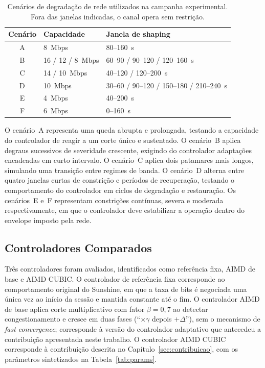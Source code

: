 \begin{table}[!t]
  \caption{Cenários de degradação de rede utilizados na campanha
  experimental. Fora das janelas indicadas, o canal opera sem
  restrição.}
  \label{tab:scenarios}
  \centering
  \begin{tabular}{cll}
    \toprule
    \textbf{Cenário} & \textbf{Capacidade} & \textbf{Janela de shaping} \\
    \midrule
    A & 8~Mbps & 80--160~s \\
    B & 16 / 12 / 8~Mbps & 60--90 / 90--120 / 120--160~s \\
    C & 14 / 10~Mbps & 40--120 / 120--200~s \\
    D & 10~Mbps & 30--60 / 90--120 / 150--180 / 210--240~s \\
    E & 4~Mbps & 40--200~s \\
    F & 6~Mbps & 0--160~s \\
    \bottomrule
  \end{tabular}
\end{table}

O cenário~A representa uma queda abrupta e prolongada,
testando a capacidade do controlador de reagir a um corte
único e sustentado. O cenário~B aplica degraus sucessivos de
severidade crescente, exigindo do controlador adaptações
encadeadas em curto intervalo. O cenário~C aplica dois
patamares mais longos, simulando uma transição entre regimes
de banda. O cenário~D alterna entre quatro janelas curtas de
constrição e períodos de recuperação, testando o
comportamento do controlador em ciclos de degradação e
restauração. Os cenários~E e~F representam constrições
contínuas, severa e moderada respectivamente, em que o
controlador deve estabilizar a operação dentro do envelope
imposto pela rede.

\subsection{Controladores Comparados}

Três controladores foram avaliados, identificados como
referência fixa, AIMD de base e AIMD CUBIC. O controlador de
referência fixa corresponde ao comportamento original do
Sunshine, em que a taxa de bits é negociada uma única vez ao
início da sessão e mantida constante até o fim. O controlador
AIMD de base aplica corte multiplicativo com fator $\beta = 0{,}7$
ao detectar congestionamento e cresce em duas fases
(``$\times \gamma$ depois $+\Delta$''), sem o mecanismo de
\emph{fast convergence}; corresponde à versão do controlador
adaptativo que antecedeu a contribuição apresentada neste
trabalho. O controlador AIMD CUBIC corresponde à contribuição
descrita no Capítulo~\ref{sec:contribuicao}, com os parâmetros
sintetizados na Tabela~\ref{tab:params}.

